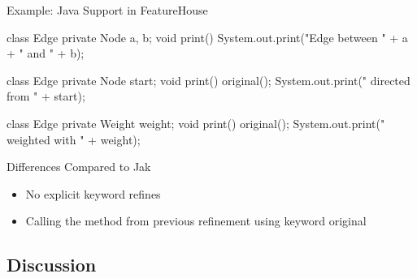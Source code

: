 \begin{frame}[fragile]{Example: Java Support in FeatureHouse}
	\begin{mycolumns}[widths={60,40},animation=none]
\begin{codetight}{}
class Edge {
	private Node a, b;
	void print() {
		System.out.print("Edge between " + a + " and " + b);
	}
}
\end{codetight}
\begin{codetight}{}
class Edge {
	private Node start;
	void print() {
		original();
		System.out.print(" directed from " + start);
	}
}
\end{codetight}
\begin{codetight}{}
class Edge {
	private Weight weight;
	void print() {
		original();
		System.out.print(" weighted with " + weight);
	}
}
\end{codetight}
	\mynextcolumn
		\begin{note}{Differences Compared to Jak}
			\begin{itemize}
				\item No explicit keyword refines 
				\item Calling the method from previous refinement using keyword original
			\end{itemize}
		\end{note}
	\end{mycolumns}
\end{frame}

\subsection{Discussion}

